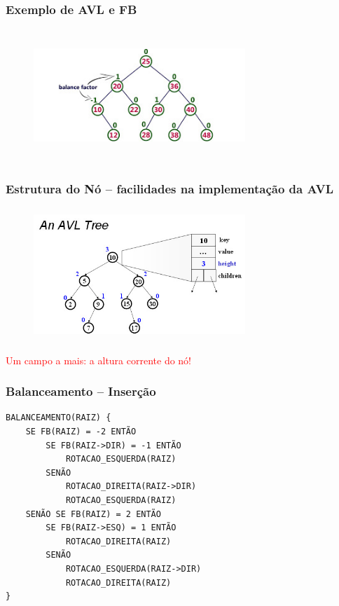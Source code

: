 \begin{frame}[fragile]
  \frametitle{Exemplo de AVL e FB}
  
   \begin{figure}[tbp]
    \includegraphics[width=8cm, height=5cm]{figs/fig_arvores/AVL-tree-example_FB.jpg}
    \centering
    \end{figure}

 \end{frame}


\begin{frame}[fragile]
  \frametitle{Estrutura do Nó -- facilidades na implementação da AVL}
  
   \begin{figure}[tbp]
    \includegraphics[width=8cm, height=5cm]{figs/fig_arvores/AVL-data_structure.jpg}
    \centering
    \end{figure}

\textcolor{red}{Um campo a mais: a altura corrente do nó!}

\end{frame}


\begin{frame}[fragile]
\frametitle{Balanceamento -- Inserção}
\begin{verbatim}
BALANCEAMENTO(RAIZ) {
    SE FB(RAIZ) = -2 ENTÃO
        SE FB(RAIZ->DIR) = -1 ENTÃO
            ROTACAO_ESQUERDA(RAIZ)
        SENÃO
            ROTACAO_DIREITA(RAIZ->DIR)
            ROTACAO_ESQUERDA(RAIZ) 
    SENÃO SE FB(RAIZ) = 2 ENTÃO
        SE FB(RAIZ->ESQ) = 1 ENTÃO
            ROTACAO_DIREITA(RAIZ)
        SENÃO
            ROTACAO_ESQUERDA(RAIZ->DIR)
            ROTACAO_DIREITA(RAIZ)
}
\end{verbatim}
\end{frame}

